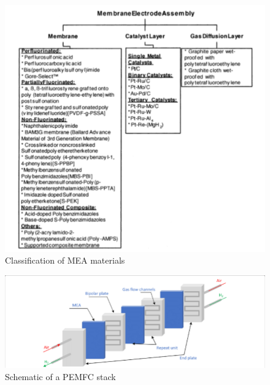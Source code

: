\begin{figure}[H]
    \includegraphics[scale=0.7]{figures/MEA.png}
    \caption{Classification of MEA materials \cite{Mehta2003}}
    \label{fig:MEA}
\end{figure}

\begin{figure}[H]
    \includegraphics[scale=0.5]{figures/PEMFCstack.png}
    \caption{Schematic of a PEMFC stack \cite{Li2019}}
    \label{fig:pemfcstack}
\end{figure}


